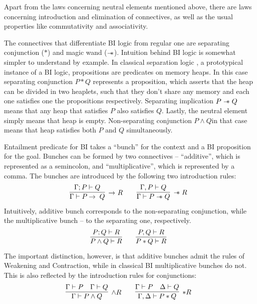 Apart from the laws concerning neutral elements mentioned above, there are laws concerning introduction and elimination of connectives, as well as the usual properties like commutativity and associativity.

The connectives that differentiate BI logic from regular one are separating conjunction (\(*\)) and magic wand (\(\mathrel{-\mkern-6mu*}\)).
Intuition behind BI logic is somewhat simpler to understand by example.
In classical separation logic \cite{reynoldsSeparationLogicLogic2002, ohearnLocalReasoningPrograms2001}, a prototypical instance of a BI logic, propositions are predicates on memory heaps.
In this case separating conjunction \(P \ast Q\) represents a proposition, which asserts that the heap can be divided in two heaplets, such that they don't share any memory and each one satisfies one the propositions respectively.
Separating implication \(P \mathrel{-\mkern-6mu*} Q\) means that any heap that satisfies \(P\) also satisfies \(Q\).
Lastly, the neutral element \emp simply means that heap is empty.
Non-separating conjunction \(P \wedge Q \)in that case means that heap satisfies both \(P\) and \(Q\) simultaneously.

Entailment predicate for BI takes a ``bunch'' for the context and a BI proposition for the goal.
Bunches can be formed by two connectives -- ``additive'', which is represented as a semincolon, and ``multiplicative'', which is represented by a comma.
The bunches are introduced by the following two introduction rules:
\begin{equation*}
  \infer[\imp R]
        {\Gamma \vdash P \imp Q}
        {\Gamma ; P \vdash Q}
  \quad \quad
  \infer[\wand R]
        {\Gamma \vdash P \wand Q}
        {\Gamma , P \vdash Q}
\end{equation*}
Intuitively, additive bunch corresponds to the non-separating conjunction, while the multiplicative bunch -- to the separating one, respectively.
\begin{equation*}
  \infer{P \wedge Q \vdash R}
        {P ; Q \vdash R}
  \quad \quad
  \infer{P \ast Q \vdash R}
        {P, Q \vdash R}
\end{equation*}
The important distinction, however, is that additive bunches admit the rules of Weakening and Contraction, while in classical BI multiplicative bunches do not.
This is also reflected by the introduction rules for conjunctions:
\begin{equation*}
  \infer[\wedge R]
        {\Gamma \vdash P \wedge Q}
        {\Gamma \vdash P &
         \Gamma \vdash Q }
  \quad \quad
  \infer[\ast R]
        {\Gamma, \Delta \vdash P \ast Q}
        {\Gamma \vdash P &
         \Delta \vdash Q }
\end{equation*}


